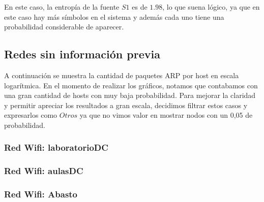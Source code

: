 En este caso, la entropía de la fuente $S1$ es de $1.98$, lo que suena lógico, ya que en este caso hay más símbolos en el sistema y además cada uno tiene una probabilidad considerable de aparecer.

\subsection{Redes sin información previa}
A continuación se muestra la cantidad de paquetes ARP por host en escala logarítmica. 
En el momento de realizar los gráficos, notamos que contabamos con una gran cantidad de hosts con muy baja probabilidad. 
Para mejorar la claridad y permitir apreciar los resultados a gran escala, decidimos filtrar estos casos y expresarlos como $Otros$ ya que 
no vimos valor en mostrar nodos con un 0,05 de probabilidad.\\

\subsubsection{Red Wifi: laboratorioDC}


\newpage
\subsubsection{Red Wifi: aulasDC}


\newpage
\subsubsection{Red Wifi: Abasto}
